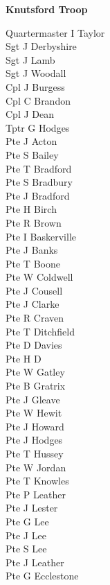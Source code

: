 \begin{center}
  \Large
  \textbf{Knutsford Troop}
\end{center}

\begin{multicols}{2}
  \noindent
  Quartermaster I Taylor \\
  Sgt J Derbyshire \\
  Sgt J Lamb \\
  Sgt J Woodall \\
  Cpl J Burgess \\
  Cpl C Brandon \\
  Cpl J Dean \\
  Tptr G Hodges \\
  Pte J Acton \\
  Pte S Bailey \\
  Pte T Bradford \\
  Pte S Bradbury \\
  Pte J Bradford \\
  Pte H Birch \\
  Pte R Brown \\
  Pte I Baskerville \\
  Pte J Banks \\
  Pte T Boone \\
  Pte W Coldwell \\
  Pte J Cousell \\
  Pte J Clarke \\
  Pte R Craven \\
  Pte T Ditchfield \\
  Pte D Davies \\
  Pte H D \\
  Pte W Gatley \\
  Pte B Gratrix \\
  Pte J Gleave \\
  Pte W Hewit \\
  Pte J Howard \\
  Pte J Hodges \\
  Pte T Hussey \\
  Pte W Jordan \\
  Pte T Knowles \\
  Pte P Leather \\
  Pte J Lester \\
  Pte G Lee \\
  Pte J Lee \\
  Pte S Lee \\
  Pte J Leather \\
  Pte G Ecclestone \\

\end{multicols}
